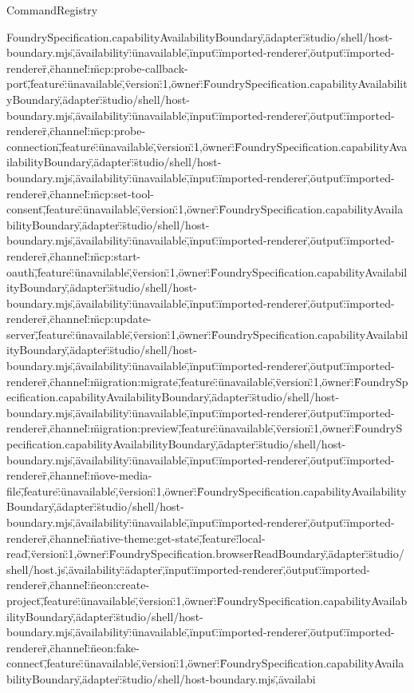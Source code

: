 \begin{lexlean}{CommandRegistry}
\begin{semanticmodule}
{FoundrySpecification.capabilityAvailabilityBoundary\",\"adapter\":\"studio/shell/host-boundary.mjs\",\"availability\":\"unavailable\",\"input\":\"imported-renderer\",\"output\":\"imported-renderer\"},{\"channel\":\"mcp:probe-callback-port\",\"feature\":\"unavailable\",\"version\":1,\"owner\":\"FoundrySpecification.capabilityAvailabilityBoundary\",\"adapter\":\"studio/shell/host-boundary.mjs\",\"availability\":\"unavailable\",\"input\":\"imported-renderer\",\"output\":\"imported-renderer\"},{\"channel\":\"mcp:probe-connection\",\"feature\":\"unavailable\",\"version\":1,\"owner\":\"FoundrySpecification.capabilityAvailabilityBoundary\",\"adapter\":\"studio/shell/host-boundary.mjs\",\"availability\":\"unavailable\",\"input\":\"imported-renderer\",\"output\":\"imported-renderer\"},{\"channel\":\"mcp:set-tool-consent\",\"feature\":\"unavailable\",\"version\":1,\"owner\":\"FoundrySpecification.capabilityAvailabilityBoundary\",\"adapter\":\"studio/shell/host-boundary.mjs\",\"availability\":\"unavailable\",\"input\":\"imported-renderer\",\"output\":\"imported-renderer\"},{\"channel\":\"mcp:start-oauth\",\"feature\":\"unavailable\",\"version\":1,\"owner\":\"FoundrySpecification.capabilityAvailabilityBoundary\",\"adapter\":\"studio/shell/host-boundary.mjs\",\"availability\":\"unavailable\",\"input\":\"imported-renderer\",\"output\":\"imported-renderer\"},{\"channel\":\"mcp:update-server\",\"feature\":\"unavailable\",\"version\":1,\"owner\":\"FoundrySpecification.capabilityAvailabilityBoundary\",\"adapter\":\"studio/shell/host-boundary.mjs\",\"availability\":\"unavailable\",\"input\":\"imported-renderer\",\"output\":\"imported-renderer\"},{\"channel\":\"migration:migrate\",\"feature\":\"unavailable\",\"version\":1,\"owner\":\"FoundrySpecification.capabilityAvailabilityBoundary\",\"adapter\":\"studio/shell/host-boundary.mjs\",\"availability\":\"unavailable\",\"input\":\"imported-renderer\",\"output\":\"imported-renderer\"},{\"channel\":\"migration:preview\",\"feature\":\"unavailable\",\"version\":1,\"owner\":\"FoundrySpecification.capabilityAvailabilityBoundary\",\"adapter\":\"studio/shell/host-boundary.mjs\",\"availability\":\"unavailable\",\"input\":\"imported-renderer\",\"output\":\"imported-renderer\"},{\"channel\":\"move-media-file\",\"feature\":\"unavailable\",\"version\":1,\"owner\":\"FoundrySpecification.capabilityAvailabilityBoundary\",\"adapter\":\"studio/shell/host-boundary.mjs\",\"availability\":\"unavailable\",\"input\":\"imported-renderer\",\"output\":\"imported-renderer\"},{\"channel\":\"native-theme:get-state\",\"feature\":\"local-read\",\"version\":1,\"owner\":\"FoundrySpecification.browserReadBoundary\",\"adapter\":\"studio/shell/host.js\",\"availability\":\"adapter\",\"input\":\"imported-renderer\",\"output\":\"imported-renderer\"},{\"channel\":\"neon:create-project\",\"feature\":\"unavailable\",\"version\":1,\"owner\":\"FoundrySpecification.capabilityAvailabilityBoundary\",\"adapter\":\"studio/shell/host-boundary.mjs\",\"availability\":\"unavailable\",\"input\":\"imported-renderer\",\"output\":\"imported-renderer\"},{\"channel\":\"neon:fake-connect\",\"feature\":\"unavailable\",\"version\":1,\"owner\":\"FoundrySpecification.capabilityAvailabilityBoundary\",\"adapter\":\"studio/shell/host-boundary.mjs\",\"availabi}
\end{semanticmodule}
\end{lexlean}
